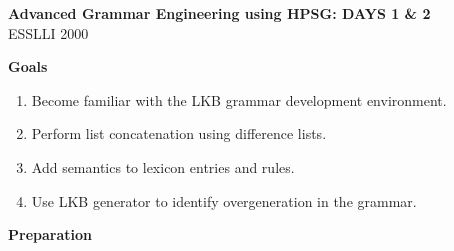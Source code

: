 \documentclass[10pt]{article}
\begin{document}
\begin{center}
\textbf{Advanced Grammar Engineering using HPSG: DAYS 1 \& 2}\\
ESSLLI 2000
\end{center}

\medskip
\textbf{Goals}
\begin{enumerate}
  \item Become familiar with the LKB grammar development environment.
  \item Perform list concatenation using difference lists.
  \item Add semantics to lexicon entries and rules.
  \item Use LKB generator to identify overgeneration in the grammar.
\end{enumerate}

\smallskip
\textbf{Preparation}
\end{document}
